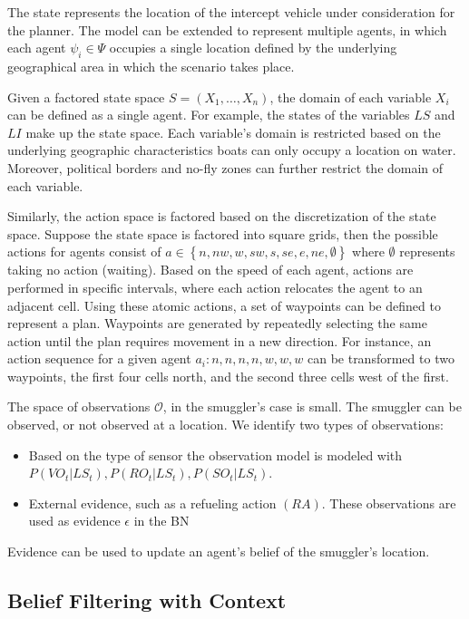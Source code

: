 \documentclass[conference]{IEEEtran}
\begin{document}
The state represents the location of the intercept vehicle under consideration for the planner. The model can be extended to represent multiple agents, in which each agent $\psi_i\in\Psi$ occupies a single location defined by the underlying geographical area in which the scenario takes place.

Given a factored state space $S = \left(X_1, \ldots, X_n\right)$, the domain of each variable $X_i$ can be defined as a single agent. For example, the states of the variables $LS$ and $LI$ make up the state space. Each variable's domain is restricted based on the underlying geographic characteristics \ie boats can only occupy a location on water. Moreover, political borders and no-fly zones can further restrict the domain of each variable.

Similarly, the action space is factored based on the discretization of the state space. Suppose the state space is factored into square grids, then the possible actions for agents consist of $a\in\left\{n, nw, w, sw, s, se, e, ne, \emptyset \right\}$ where $\emptyset$ represents taking no action (\ie waiting). Based on the speed of each agent, actions are performed in specific intervals, where each action relocates the agent to an adjacent cell. Using these atomic actions, a set of waypoints can be defined to represent a plan. Waypoints are generated by repeatedly selecting the same action until the plan requires movement in a new direction. For instance, an action sequence for a given agent $a_i: n, n, n, n, w, w, w$ can be transformed to two waypoints, the first four cells north, and the second three cells west of the first.

The space of observations $\mathcal{O}$, in the smuggler's case is small. The smuggler can be observed, or not observed at a location. We identify two types of observations:
\begin{itemize}
\item Based on the type of sensor the observation model is modeled with $P(VO_t|LS_t), P(RO_t|LS_t), P(SO_t|LS_t)$.
\item External evidence, such as a refueling action $(RA)$. These observations are used as evidence $\epsilon$ in the BN
\end{itemize}
Evidence can be used to update an agent's belief of the smuggler's location.

\subsection{Belief Filtering with Context}
\label{subsec:belief-filter}
\end{document}
